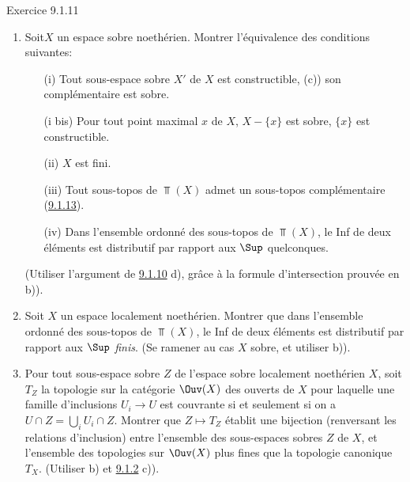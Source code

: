 \begin{enonce*}[remark]{Exercice 9.1.11}
\begin{enumerate}
\begin{enumerate}
\item $X'$ et $X''$ sont sobres.

\item $X'$ est sobre, et le sous-topos $E_{X'}\approxeq \Top(X')$ de
$E=\Top(X)$ admet un sous-topos « complémentaire »  (\cf
{}.

\item L'intersection des sous-topos $E_{X'}\approx\Top(X')$ et
$E_{X''}\approx\Top(X'')$ de $E=\Top(X)$ est le sous-topos
« vide » de $E$.
\end{enumerate}

Montrer que si $E'$ et $E''$ sont deux sous-topos de $E$, ils sont
complémentaires faibles si et seulement si ils sont complémentaires
(\hyperref[IV.exer9.1.13]{9.1.13}).

\item Soit\pageoriginale $X$ un espace sobre noethérien. Montrer
l'équivalence des conditions suivantes:
\begin{itemize}
\item[(i)] Tout sous-espace sobre $X'$ de $X$ est constructible, \ie
(c)) son complémentaire est sobre.

\item[(i bis)] Pour tout point maximal $x$ de $X$, $X-\{x\}$ est
sobre, \ie $\{x\}$ est constructible.

\item[(ii)] $X$ est fini.

\item[(iii)] Tout sous-topos de $\Top(X)$ admet un sous-topos
complémentaire (\cf \hyperref[IV.exer9.1.13]{9.1.13}).

\item[(iv)] Dans l'ensemble ordonné des sous-topos de $\Top(X)$, le
Inf de deux éléments est distributif par rapport aux $\Sup$
quelconques.
\end{itemize}
(Utiliser l'argument de \hyperref[IV.exer9.1.10]{9.1.10} d), grâce à la formule
d'intersection prouvée en b)).

\item Soit $X$ un espace localement noethérien. Montrer que dans
l'ensemble ordonné des sous-topos de $\Top(X)$, le Inf de deux
éléments est distributif par rapport aux $\Sup$ \emph{finis}. (Se
ramener au cas $X$ sobre, et utiliser b)).

\item Pour tout sous-espace sobre $Z$ de l'espace sobre localement
noethérien $X$, soit $T_Z$ la topologie sur la catégorie $\Ouv(X)$
des ouverts de $X$ pour laquelle une famille d'inclusions
$U_i\rightarrow U$ est couvrante si et seulement si on a $U\cap
Z=\bigcup_i U_i \cap Z$. Montrer que $Z\mapsto T_Z$ établit une
bijection (renversant les relations d'inclusion) entre l'ensemble
des sous-espaces sobres $Z$ de $X$, et l'ensemble des topologies sur
$\Ouv(X)$ plus fines que la topologie canonique $T_X$. (Utiliser b)
et \hyperref[IV.rem9.1.2]{9.1.2} c)).


\end{enumerate}
\end{enonce*}
